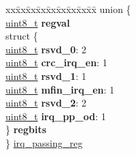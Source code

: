 \begin{DoxyCompactItemize}
\begin{tabbing}
\end{tabbing}\item 
\begin{tabbing}
xx\=xx\=xx\=xx\=xx\=xx\=xx\=xx\=xx\=\kill
union \{\\
\>\hyperlink{vl53l0x__types_8h_aba7bc1797add20fe3efdf37ced1182c5}{uint8\_t} {\bfseries regval}\\
\>struct \{\\
\>\>\hyperlink{vl53l0x__types_8h_aba7bc1797add20fe3efdf37ced1182c5}{uint8\_t} {\bfseries rsvd\_0}: 2\\
\>\>\hyperlink{vl53l0x__types_8h_aba7bc1797add20fe3efdf37ced1182c5}{uint8\_t} {\bfseries crc\_irq\_en}: 1\\
\>\>\hyperlink{vl53l0x__types_8h_aba7bc1797add20fe3efdf37ced1182c5}{uint8\_t} {\bfseries rsvd\_1}: 1\\
\>\>\hyperlink{vl53l0x__types_8h_aba7bc1797add20fe3efdf37ced1182c5}{uint8\_t} {\bfseries mfin\_irq\_en}: 1\\
\>\>\hyperlink{vl53l0x__types_8h_aba7bc1797add20fe3efdf37ced1182c5}{uint8\_t} {\bfseries rsvd\_2}: 2\\
\>\>\hyperlink{vl53l0x__types_8h_aba7bc1797add20fe3efdf37ced1182c5}{uint8\_t} {\bfseries irq\_pp\_od}: 1\\
\>\} {\bfseries regbits}\\
\} \hyperlink{structstruct_aa5145a6200deee0b11aa3f5f5cc259f8}{irq\_passing\_reg}\\


\end{tabbing}
\end{DoxyCompactItemize}
